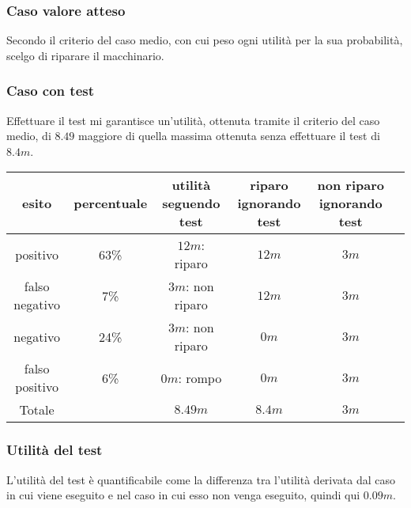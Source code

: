 \documentclass[\main/main.tex]{subfiles}
\begin{document}
\subsubsection*{Caso valore atteso}
\begin{figure}
\end{figure}

Secondo il criterio del caso medio, con cui peso ogni utilità per la sua probabilità, scelgo di riparare il macchinario.

\subsubsection*{Caso con test}
Effettuare il test mi garantisce un'utilità, ottenuta tramite il criterio del caso medio, di $8.49$ maggiore di quella massima ottenuta senza effettuare il test di $8.4m$.

\begin{table}
  \begin{tabular}{|c|c|c|c|c|c|}
    \hline
    esito          & percentuale & utilità seguendo test & riparo ignorando test & non riparo ignorando test \\
    \hline
    positivo       & 63\%        & $12m$: riparo         & $12m$                 & $3m$                      \\
    \hline
    falso negativo & 7\%         & $3m$: non riparo      & $12m$                 & $3m$                      \\
    \hline
    negativo       & 24\%        & $3m$: non riparo      & $0m$                  & $3m$                      \\
    \hline
    falso positivo & 6\%         & $0m$: rompo           & $0m$                  & $3m$                      \\
    \hline
    \hline
    Totale         &             & $8.49m$               & $8.4m$                & $3m$                      \\
    \hline
  \end{tabular}
\end{table}

\subsubsection*{Utilità del test}
L'utilità del test è quantificabile come la differenza tra l'utilità derivata dal caso in cui viene eseguito e nel caso in cui esso non venga eseguito, quindi qui $0.09m$.
\end{document}
